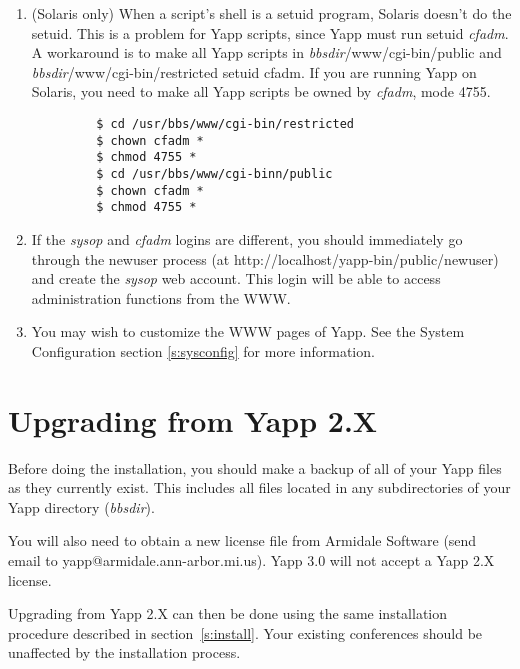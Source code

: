 \documentclass[twoside]{report}
\begin{document}
\begin{enumerate}
   \item (Solaris only) When a script's shell is a setuid 
      program, Solaris doesn't do the setuid.  This is a 
      problem for Yapp scripts, since Yapp must run setuid {\em cfadm}.  
      A workaround is to make all Yapp scripts in 
      {\em bbsdir}/www/cgi-bin/public and 
      {\em bbsdir}/www/cgi-bin/restricted setuid cfadm.  If you are running
      Yapp on Solaris, you need to make all Yapp scripts be owned by 
      {\em cfadm}, mode 4755.
         \begin{verbatim}
         $ cd /usr/bbs/www/cgi-bin/restricted
         $ chown cfadm *
         $ chmod 4755 *
         $ cd /usr/bbs/www/cgi-binn/public
         $ chown cfadm *
         $ chmod 4755 *
         \end{verbatim}



   \item If the {\em sysop} and {\em cfadm} logins are different, you should
         immediately go through the newuser process (at 
         http://localhost/yapp-bin/public/newuser) and create the {\em sysop}
         web account.  This login will be able to access administration
         functions from the WWW.

   \item You may wish to customize the WWW pages of Yapp.  See the System
         Configuration section \ref{s:sysconfig} for more information.

   \end{enumerate}   

\section{Upgrading from Yapp 2.X}
   Before doing the installation, you should make a backup of all 
   of your Yapp files as they currently exist.  This includes all
   files located in any subdirectories of your Yapp directory 
   ({\em bbsdir}).
   
   You will also need to obtain a new license file from Armidale Software 
   (send email to yapp@armidale.ann-arbor.mi.us).  Yapp 3.0 will
   not accept a Yapp 2.X license.

   Upgrading from Yapp 2.X can then be done using the same installation 
   procedure described in section~\ref{s:install}.  Your existing conferences 
   should be unaffected by the installation process.  
\end{document}
